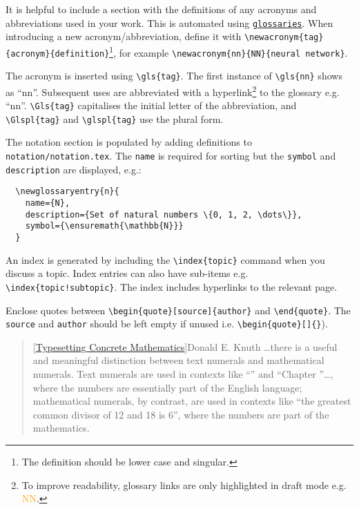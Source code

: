 

It is helpful to include a section with the definitions of any acronyms and abbreviations
used in your work. This is automated using \href{https://ctan.org/pkg/glossaries}{\texttt{glossaries}}.
When introducing a new acronym/abbreviation, define it with \verb|\newacronym{tag}{acronym}{definition}|\footnote{The 
definition should be lower case and singular.}, for example \verb|\newacronym{nn}{NN}{neural network}|.

The acronym is inserted using \verb|\gls{tag}|. The first instance of \verb|\gls{nn}| shows
as ``\gls{nn}''. Subsequent uses are abbreviated with a hyperlink\footnote{To improve readability,
glossary links are only highlighted in draft mode e.g. \textcolor{orange}{NN}.} to the glossary
e.g. ``\gls{nn}''. \verb|\Gls{tag}| capitalises the initial letter of the abbreviation, 
and \verb|\Glspl{tag}| and \verb|\glspl{tag}| use the plural form.

The notation section is populated by adding definitions to \texttt{notation/notation.tex}.
The \texttt{name} is required for sorting but the \texttt{symbol} and \texttt{description}
are displayed, e.g.:
\begin{verbatim}
  \newglossaryentry{n}{
    name={N},
    description={Set of natural numbers \{0, 1, 2, \dots\}},
    symbol={\ensuremath{\mathbb{N}}}
  }
\end{verbatim}


An index is generated by including the \verb|\index{topic}| command when you discuss a topic.
Index entries can also have sub-items e.g. \verb|\index{topic!subtopic}|. The index includes
hyperlinks to the relevant page.


Enclose quotes between \verb|\begin{quote}[source]{author}| and \verb|\end{quote}|. The
\texttt{source} and \texttt{author} should be left empty if unused i.e. \verb|\begin{quote}[]{}|).

\begin{quote}[\href{https://www.tug.org/TUGboat/Articles/tb10-1/tb23knut.pdf}{Typesetting Concrete Mathematics}]{Donald E. Knuth}
  \dots there is a useful and meaningful distinction between text numerals and mathematical
  numerals. Text numerals are used in contexts like ``'' and ``Chapter ''\dots,
  where the numbers are essentially part of the English language; mathematical numerals, by contrast,
  are used in contexts like ``the greatest common divisor of 12 and 18 is 6'', where the numbers
  are part of the mathematics.
\end{quote}


